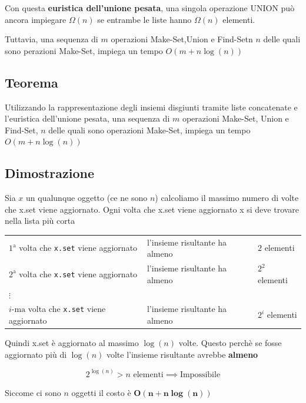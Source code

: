 Con questa \textbf{euristica dell'unione pesata}, una singola operazione UNION può ancora impiegare $\Omega(n)$ se entrambe le liste hanno $\Omega(n)$ elementi.

Tuttavia, una sequenza di $m$ operazioni Make-Set,Union e Find-Setn $n$ delle quali sono perazioni Make-Set, impiega un tempo $O(m+n\log(n))$

\subsection{Teorema}
Utilizzando la rappresentazione degli insiemi disgiunti tramite liste concatenate e l'euristica dell'unione pesata, una sequenza di $m$ operazioni Make-Set, Union e Find-Set, $n$ delle quali sono operazioni Make-Set, impiega un tempo $O(m+n\log(n))$

\subsection{Dimostrazione}
Sia $x$ un qualunque oggetto (ce ne sono $n$) calcoliamo il massimo numero di volte che x.set viene aggiornato. Ogni volta che x.set viene aggiornato x si deve trovare nella lista più corta

\begin{table}[htbp]
\centering
\renewcommand{\arraystretch}{1.5}
    \begin{tabular}{lll}
    $1^{\text{a}}$ volta che \texttt{x.set} viene aggiornato & l'insieme risultante ha almeno & $2$ elementi \\
    $2^{\text{a}}$ volta che \texttt{x.set} viene aggiornato  & l'insieme risultante ha almeno & $2^2$ elementi \\
    \hspace{2.3em} $\vdots$ & & \\
    $i\text{-ma}$ volta che \texttt{x.set} viene aggiornato & l'insieme risultante ha almeno & $2^i$ elementi
    \end{tabular}
\end{table}

Quindi x.set è aggiornato al massimo $\log(n)$ volte. Questo perchè se fosse aggiornato più di $\log(n)$ volte l'insieme risultante avrebbe \textbf{almeno}

$$
    2^{\log(n)} > n \text{ elementi} \implies \text{Impossibile}
$$

Siccome ci sono $n$ oggetti il costo è $\mathbf{O(n+n\log(n))}$

